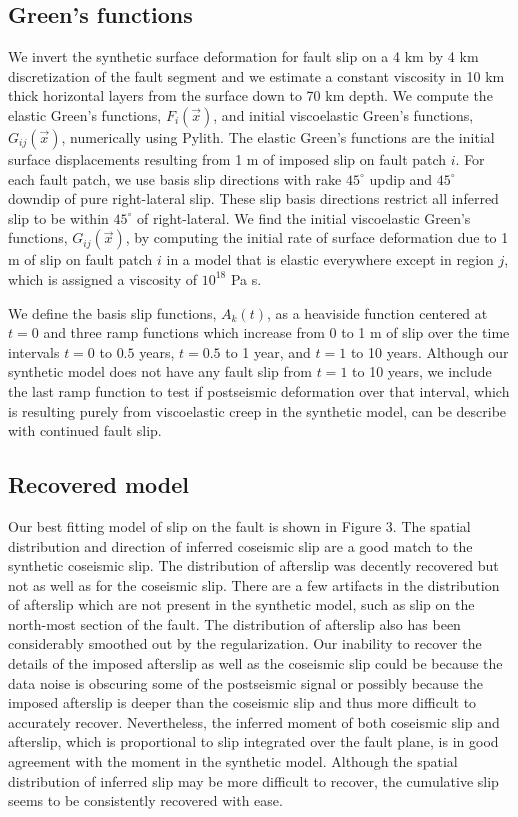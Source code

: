 \documentclass[extra,mreferee]{gji}
\begin{document}
\subsection{Green's functions}

We invert the synthetic surface deformation for fault slip on a 4 km
by 4 km discretization of the fault segment and we estimate a constant
viscosity in 10 km thick horizontal layers from the surface down to 70
km depth. We compute the elastic Green's functions, $F_i(\vec{x})$,
and initial viscoelastic Green's functions, $G_{ij}(\vec{x})$,
numerically using Pylith.  The elastic Green's functions are the
initial surface displacements resulting from 1 m of imposed slip on
fault patch $i$.  For each fault patch, we use basis slip directions
with rake $45^\circ$ updip and $45^\circ$ downdip of pure
right-lateral slip.  These slip basis directions restrict all inferred
slip to be within $45^\circ$ of right-lateral. We find the initial
viscoelastic Green's functions, $G_{ij}(\vec{x})$, by computing the
initial rate of surface deformation due to 1 m of slip on fault
patch $i$ in a model that is elastic everywhere except in region $j$,
which is assigned a viscosity of $10^{18}$ Pa s.

We define the basis slip functions, $A_k(t)$, as a heaviside function
centered at $t=0$ and three ramp functions which increase from 0 to 1
m of slip over the time intervals $t=0$ to $0.5$ years, $t=0.5$ to 1
year, and $t=1$ to 10 years.  Although our synthetic model does not
have any fault slip from $t=1$ to 10 years, we include the last
ramp function to test if postseismic deformation over that interval,
which is resulting purely from viscoelastic creep in the synthetic
model, can be describe with continued fault slip.

\subsection{Recovered model}

Our best fitting model of slip on the fault is shown in Figure 3.  The
spatial distribution and direction of inferred coseismic slip are a
good match to the synthetic coseismic slip.  The distribution of
afterslip was decently recovered but not as well as for the coseismic
slip.  There are a few artifacts in the distribution of afterslip
which are not present in the synthetic model, such as slip on the
north-most section of the fault.  The distribution of afterslip also
has been considerably smoothed out by the regularization. Our
inability to recover the details of the imposed afterslip as well as
the coseismic slip could be because the data noise is obscuring some
of the postseismic signal or possibly because the imposed afterslip is
deeper than the coseismic slip and thus more difficult to accurately
recover.  Nevertheless, the inferred moment of both coseismic slip and
afterslip, which is proportional to slip integrated over the fault
plane, is in good agreement with the moment in the synthetic model.
Although the spatial distribution of inferred slip may be more
difficult to recover, the cumulative slip seems to be consistently
recovered with ease.
\end{document}
